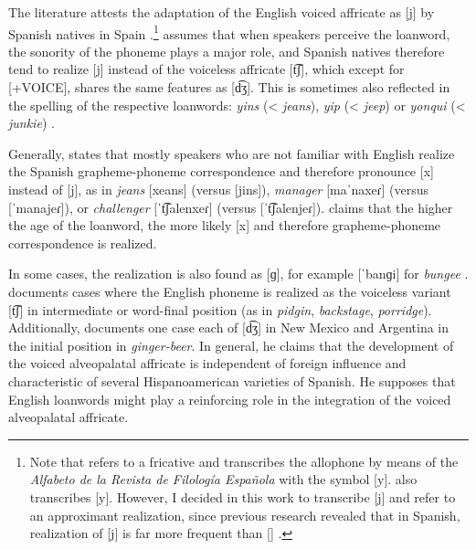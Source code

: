 \documentclass[output=paper]{langscibook}
\begin{document}
The literature attests the adaptation of the English voiced affricate as [j] by Spanish natives in Spain \citetext{\citealp[107]{RodriguezGonzalez2017}; \citealp[7]{GomezCapuz2001}}.\footnote{Note that \citet[29]{GomezCapuz2001} refers to a fricative and transcribes the allophone by means of the \textit{Alfabeto de la Revista de Filología Española} with the symbol [y]. \citet[107]{RodriguezGonzalez2017} also transcribes [y]. However, I decided in this work to transcribe [j] and refer to an approximant realization, since previous research revealed that in Spanish, realization of [j] is far more frequent than [\textctj] \citep[]{MartinezCeldran2015}.} \citet[29]{GomezCapuz2001} assumes that when speakers perceive the loanword, the sonority of the phoneme plays a major role, and Spanish natives therefore tend to realize [j] instead of the voiceless affricate [t͡ʃ], which except for [+VOICE], shares the same features as [d͡ʒ].
This is sometimes also reflected in the spelling of the respective loanwords: \textit{yins} (< \textit{jeans}), \textit{yip} (< \textit{jeep}) or \textit{yonqui} (< \textit{junkie}) \citep[107]{RodriguezGonzalez2017}.

Generally, \citet[107]{RodriguezGonzalez2017} states that mostly speakers who are not familiar with English realize the Spanish grapheme-phoneme correspondence and therefore pronounce [x] instead of [j], as in \textit{jeans} [xeans] (versus [jins]), \textit{manager} [maˈnaxeɾ⁠] (versus [ˈmanajeɾ]), or \textit{challenger} [ˈt͡ʃalenxeɾ] (versus [ˈt͡ʃalenjeɾ]).
\citet[21]{GomezCapuz2001} claims that the higher the age of the loanword, the more likely [x] and therefore grapheme-phoneme correspondence is realized.

In some cases, the realization is also found as [ɡ], for example [ˈbanɡi] for \textit{bun\-gee} \citep[108]{RodriguezGonzalez2017}. \citet[107]{RodriguezGonzalez2017} documents cases where the English phoneme is realized as the voiceless variant [t͡ʃ] in intermediate or word-final position (as in \textit{pidgin}, \textit{backstage}, \textit{porridge}). Additionally, \citet[211–213]{Cassano1973} documents one case each of [d͡ʒ] in New Mexico and Argentina in the initial position in \textit{ginger-beer}. In general, he claims that the development of the voiced alveopalatal affricate is independent of foreign influence and characteristic of several Hispanoamerican varieties of Spanish. He supposes that English loanwords might play a reinforcing role in the integration of the voiced alveopalatal affricate.
\end{document}
